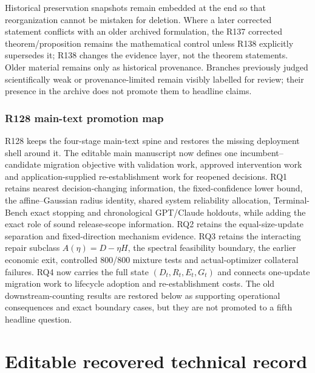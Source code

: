 \documentclass[11pt,letterpaper]{article}
\theoremstyle{plain}
\newcommand{\1}{\mathbf 1}
\begin{document}
Historical preservation snapshots remain embedded at the end so that reorganization cannot be mistaken for deletion. Where a later corrected statement conflicts with an older archived formulation, the R137 corrected theorem/proposition remains the mathematical control unless R138 explicitly supersedes it; R138 changes the evidence layer, not the theorem statements. Older material remains only as historical provenance. Branches previously judged scientifically weak or provenance-limited remain visibly labelled for review; their presence in the archive does not promote them to headline claims.


\section*{R128 main-text promotion map}
R128 keeps the four-stage main-text spine and restores the missing deployment shell around it. The editable main manuscript now defines one incumbent--candidate migration objective with validation work, approved intervention work and application-supplied re-establishment work for reopened decisions. RQ1 retains nearest decision-changing information, the fixed-confidence lower bound, the affine--Gaussian radius identity, shared system reliability allocation, Terminal-Bench exact stopping and chronological GPT/Claude holdouts, while adding the exact role of sound release-scope information. RQ2 retains the equal-size-update separation and fixed-direction mechanism evidence. RQ3 retains the interacting repair subclass $A(\eta)=D-\eta H$, the spectral feasibility boundary, the earlier economic exit, controlled 800/800 mixture tests and actual-optimizer collateral failures. RQ4 now carries the full state $(D_t,R_t,E_t,G_t)$ and connects one-update migration work to lifecycle adoption and re-establishment costs. The old downstream-counting results are restored below as supporting operational consequences and exact boundary cases, but they are not promoted to a fifth headline question.

\tableofcontents
\clearpage
\part{Editable recovered technical record}
\end{document}
